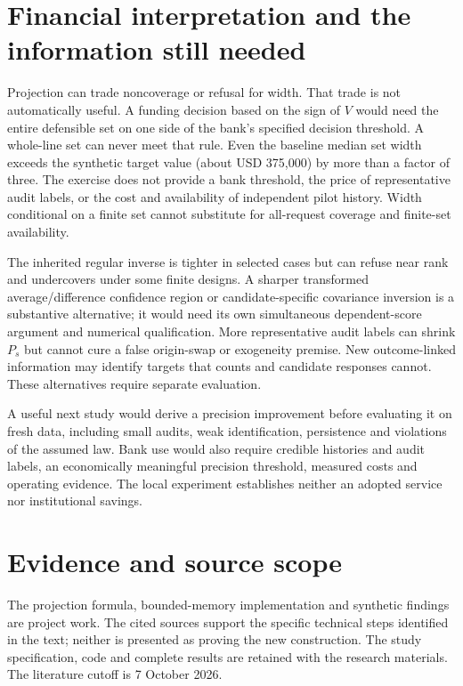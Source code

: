 \section{Financial interpretation and the information still needed}

Projection can trade noncoverage or refusal for width. That trade is not
automatically useful. A funding decision based on the sign of $V$ would need
the entire defensible set on one side of the bank's specified decision
threshold. A whole-line set can never meet that rule. Even the baseline median
set width exceeds the synthetic target value (about USD 375,000) by more than
a factor of three. The exercise does not provide a bank threshold, the price
of representative audit labels, or the cost and availability of independent
pilot history. Width conditional on a finite set cannot substitute for
all-request coverage and finite-set availability.

The inherited regular inverse is tighter in selected cases but can refuse
near rank and undercovers under some finite designs. A sharper transformed
average/difference confidence region or candidate-specific covariance
inversion is a substantive alternative; it would need its own simultaneous
dependent-score argument and numerical qualification. More representative
audit labels can shrink $P_s$ but cannot cure a false origin-swap or
exogeneity premise. New outcome-linked information may identify targets that
counts and candidate responses cannot. These alternatives require separate evaluation.

A useful next study would derive a precision improvement before
evaluating it on fresh data, including small audits, weak identification,
persistence and violations of the assumed law. Bank use would also require
credible histories and audit labels, an economically meaningful precision
threshold, measured costs and operating evidence. The local experiment
establishes neither an adopted service nor institutional savings.

\section*{Evidence and source scope}

The projection formula, bounded-memory implementation and synthetic
findings are project work. The cited sources support the specific technical
steps identified in the text; neither is presented as proving the new
construction. The study specification, code and complete results are retained
with the research materials. The literature cutoff is 7 October 2026.
